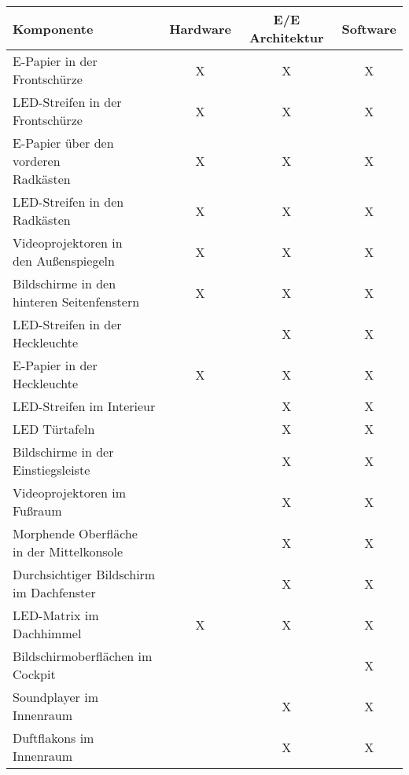 \begin{table}[hbt]	
	\centering
	\renewcommand{\arraystretch}{1.5}	%
	\label{tab:Entwicklung}
	\begin{tabular}{l|ccc}
		\textbf{Komponente} & \textbf{Hardware} & \textbf{E/E Architektur} & \textbf{Software} \\ 
		\hline 
		\hline 
		\parbox[t]{0.4\linewidth}{\RaggedRight E-Papier in der Frontschürze} & X & X & X \\
		\parbox[t]{0.4\linewidth}{\RaggedRight LED-Streifen in der Frontschürze} & X & X & X \\
		\parbox[t]{0.4\linewidth}{\RaggedRight E-Papier über den vorderen\\ Radkästen} & X & X & X \\
		\parbox[t]{0.4\linewidth}{\RaggedRight LED-Streifen in den Radkästen} & X & X & X \\
		\parbox[t]{0.4\linewidth}{\RaggedRight Videoprojektoren in\\den Außenspiegeln} & X & X & X \\
		\parbox[t]{0.4\linewidth}{\RaggedRight Bildschirme in den\\hinteren Seitenfenstern} & X & X & X \\
		\parbox[t]{0.4\linewidth}{\RaggedRight LED-Streifen in der Heckleuchte} &  & X & X \\
		\parbox[t]{0.4\linewidth}{\RaggedRight E-Papier in der Heckleuchte} & X & X & X \\
		\parbox[t]{0.4\linewidth}{\RaggedRight LED-Streifen im Interieur} &  & X & X \\
		\parbox[t]{0.4\linewidth}{\RaggedRight LED Türtafeln} &  & X & X \\
		\parbox[t]{0.4\linewidth}{\RaggedRight Bildschirme in der Einstiegsleiste} &  & X & X \\
		\parbox[t]{0.4\linewidth}{\RaggedRight Videoprojektoren im Fußraum} &  & X & X \\
		\parbox[t]{0.4\linewidth}{\RaggedRight Morphende Oberfläche\\in der Mittelkonsole} &  & X & X \\
		\parbox[t]{0.4\linewidth}{\RaggedRight Durchsichtiger Bildschirm\\im Dachfenster} &  & X & X \\
		LED-Matrix im Dachhimmel & X & X & X \\
		\parbox[t]{0.4\linewidth}{\RaggedRight Bildschirmoberflächen im Cockpit} &  &  & X \\
		\parbox[t]{0.4\linewidth}{\RaggedRight Soundplayer im Innenraum} &  & X & X \\
		\parbox[t]{0.4\linewidth}{\RaggedRight Duftflakons im Innenraum} &  & X & X \\
	\end{tabular} 
\end{table}
